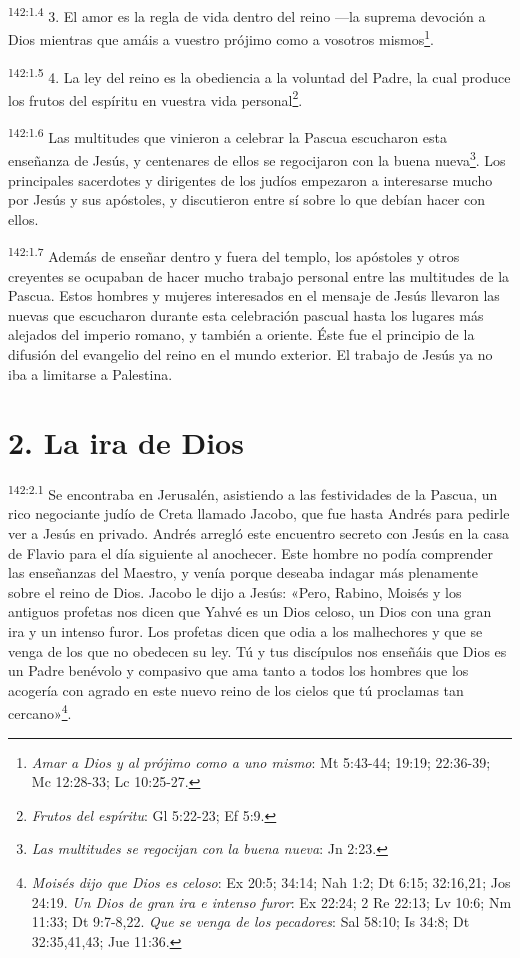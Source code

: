 \par 
\textsuperscript{142:1.4} 3. El amor es la regla de vida dentro del reino ---la suprema devoción a Dios mientras que amáis a vuestro prójimo como a vosotros mismos\footnote{\textit{Amar a Dios y al prójimo como a uno mismo}: Mt 5:43-44; 19:19; 22:36-39; Mc 12:28-33; Lc 10:25-27.}.

\par 
\textsuperscript{142:1.5} 4. La ley del reino es la obediencia a la voluntad del Padre, la cual produce los frutos del espíritu en vuestra vida personal\footnote{\textit{Frutos del espíritu}: Gl 5:22-23; Ef 5:9.}.

\par 
\textsuperscript{142:1.6} Las multitudes que vinieron a celebrar la Pascua escucharon esta enseñanza de Jesús, y centenares de ellos se regocijaron con la buena nueva\footnote{\textit{Las multitudes se regocijan con la buena nueva}: Jn 2:23.}. Los principales sacerdotes y dirigentes de los judíos empezaron a interesarse mucho por Jesús y sus apóstoles, y discutieron entre sí sobre lo que debían hacer con ellos.

\par 
\textsuperscript{142:1.7} Además de enseñar dentro y fuera del templo, los apóstoles y otros creyentes se ocupaban de hacer mucho trabajo personal entre las multitudes de la Pascua. Estos hombres y mujeres interesados en el mensaje de Jesús llevaron las nuevas que escucharon durante esta celebración pascual hasta los lugares más alejados del imperio romano, y también a oriente. Éste fue el principio de la difusión del evangelio del reino en el mundo exterior. El trabajo de Jesús ya no iba a limitarse a Palestina.

\section*{2. La ira de Dios}
\par 
\textsuperscript{142:2.1} Se encontraba en Jerusalén, asistiendo a las festividades de la Pascua, un rico negociante judío de Creta llamado Jacobo, que fue hasta Andrés para pedirle ver a Jesús en privado. Andrés arregló este encuentro secreto con Jesús en la casa de Flavio para el día siguiente al anochecer. Este hombre no podía comprender las enseñanzas del Maestro, y venía porque deseaba indagar más plenamente sobre el reino de Dios. Jacobo le dijo a Jesús: «Pero, Rabino, Moisés y los antiguos profetas nos dicen que Yahvé es un Dios celoso, un Dios con una gran ira y un intenso furor. Los profetas dicen que odia a los malhechores y que se venga de los que no obedecen su ley. Tú y tus discípulos nos enseñáis que Dios es un Padre benévolo y compasivo que ama tanto a todos los hombres que los acogería con agrado en este nuevo reino de los cielos que tú proclamas tan cercano»\footnote{\textit{Moisés dijo que Dios es celoso}: Ex 20:5; 34:14; Nah 1:2; Dt 6:15; 32:16,21; Jos 24:19. \textit{Un Dios de gran ira e intenso furor}: Ex 22:24; 2 Re 22:13; Lv 10:6; Nm 11:33; Dt 9:7-8,22. \textit{Que se venga de los pecadores}: Sal 58:10; Is 34:8; Dt 32:35,41,43; Jue 11:36.}.

